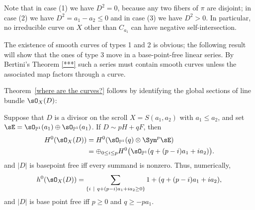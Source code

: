 Note that in case (1) we have $D^{2} = 0$, because any two fibers of $\pi$ are disjoint; in case (2) we have $D^{2}= a_{1}-a_{2}\leq 0$ and in case (3) we have $D^{2}>0$. In particular, no irreducible curve
on $X$ other than $C_{a_1}$ can have negative self-intersection.

The existence of smooth curves of types 1 and 2 is obvious; the following result will show that
the ones of type 3 move in a base-point-free linear series. By Bertini's Theorem \ref{***} such a series must contain smooth curves unless the associated map factors through a curve.

Theorem~\ref{where are the curves?} follows by identifying the global sections of line bundle $\sO_{X}(D)$:

\begin{theorem}\label{global sections}
Suppose that $D$ is a divisor on the scroll $X = S(a_{1}, a_{2})$ with $a_{1}\leq a_{2}$, and
set $\sE = \sO_{\PP^{1}}(a_{1})\oplus \sO_{\PP^{1}}(a_{1})$.   If $D \sim pH+qF$, then 
\begin{align*}
 H^{0}(\sO_{X}(D)) &= H^{0}(\sO_{\PP^{1}}(q) \otimes \Sym^{p} \sE)\\
 &= 
\oplus_{0\leq i\leq p}H^{0}\bigl(\sO_{\PP^{1}}(q + (p-i)a_{1}+i a_{2})\bigr).
\end{align*}
and $|D|$ is basepoint free iff every summand is nonzero.
Thus, numerically,
$$
h^{0}(\sO_{X}(D)) = 
\sum_{\{i\ \mid\ q+(p-i)a_{1}+i a_{2} \geq 0\}}1+(q + (p-i)a_{1}+i a_{2}),
$$
and
$|D|$ is base point free iff $p\geq 0$ and $q\geq -pa_{1}$.
\end{theorem}

